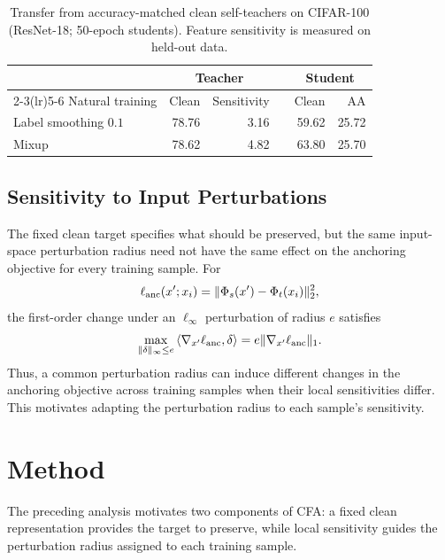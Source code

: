\documentclass{article} %
\theoremstyle{plain}
\begin{document}
\begin{table}[!htbp]
  \centering
  \small
  \setlength{\tabcolsep}{4.5pt}
  \caption{Transfer from accuracy-matched clean self-teachers on CIFAR-100
  (ResNet-18; 50-epoch students). Feature sensitivity is measured on held-out
  data.}
  \label{tab:matchedteacher}
  \begin{tabular}{lrrcrr}
    \toprule
    & \multicolumn{2}{c}{Teacher} && \multicolumn{2}{c}{Student} \\
    \cmidrule(lr){2-3}\cmidrule(lr){5-6}
    Natural training & Clean & Sensitivity && Clean & AA \\
    \midrule
    Label smoothing \(0.1\) & 78.76 & 3.16 && 59.62 & 25.72 \\
    Mixup & 78.62 & 4.82 && 63.80 & 25.70 \\
    \bottomrule
  \end{tabular}
\end{table}

\subsection{Sensitivity to Input Perturbations}
\label{sec:sensitivity_analysis}

The fixed clean target specifies what should be preserved, but the same
input-space perturbation radius need not have the same effect on the anchoring
objective for every training sample. For
\[
\ell_{\rm anc}(x';x_i)
=
\|\Phi_s(x')-\Phi_t(x_i)\|_2^2,
\]
the first-order change under an \(\ell_\infty\) perturbation of radius \(e\)
satisfies
\begin{equation}
\max_{\|\delta\|_\infty\le e}
\left\langle
\nabla_{x'}\ell_{\rm anc},\delta
\right\rangle
=
e\|\nabla_{x'}\ell_{\rm anc}\|_1.
\label{eqn:firstorder}
\end{equation}
Thus, a common perturbation radius can induce different changes in the
anchoring objective across training samples when their local sensitivities
differ. This motivates adapting the perturbation radius to each sample's
sensitivity.

\section{Method}
\label{sec:method}

The preceding analysis motivates two components of CFA: a fixed clean
representation provides the target to preserve, while local sensitivity
guides the perturbation radius assigned to each training sample.
\end{document}
